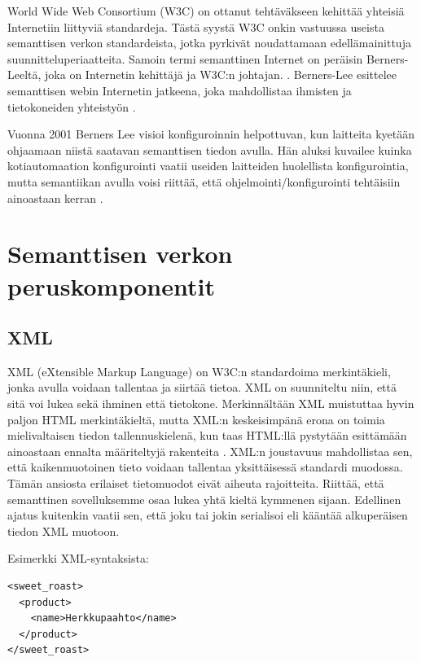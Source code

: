 \documentclass[finnish, 12pt, a4paper, elec, utf8, pdfa, online]{aaltothesis}
\begin{document}
World Wide Web Consortium (W3C) on ottanut tehtäväkseen kehittää yhteisiä Internetiin liittyviä standardeja. Tästä syystä W3C onkin vastuussa useista semanttisen verkon standardeista, jotka pyrkivät noudattamaan edellämainittuja suunnitteluperiaatteita. Samoin termi semanttinen Internet on peräisin Berners-Leeltä, joka on Internetin kehittäjä ja W3C:n johtajan. \cite{W3C}. Berners-Lee esittelee semanttisen webin Internetin jatkeena, joka mahdollistaa ihmisten ja tietokoneiden yhteistyön \cite{Berners_visio}.





Vuonna 2001 Berners Lee visioi konfiguroinnin helpottuvan, kun laitteita kyetään ohjaamaan niistä saatavan semanttisen tiedon avulla. Hän aluksi kuvailee kuinka kotiautomaation konfigurointi vaatii useiden laitteiden huolellista konfigurointia, mutta semantiikan avulla voisi riittää, että ohjelmointi/konfigurointi tehtäisiin ainoastaan kerran \cite{Berners_visio}.







\clearpage
\section{Semanttisen verkon peruskomponentit}

\subsection{XML}
XML (eXtensible Markup Language) on W3C:n standardoima merkintäkieli, jonka avulla voidaan tallentaa ja siirtää tietoa. XML on suunniteltu niin, että sitä voi lukea sekä ihminen että tietokone. Merkinnältään XML muistuttaa hyvin paljon HTML merkintäkieltä, mutta XML:n keskeisimpänä erona on toimia mielivaltaisen tiedon tallennuskielenä, kun taas HTML:llä pystytään esittämään ainoastaan ennalta määriteltyjä rakenteita \cite{IEEE_XML}. XML:n joustavuus mahdollistaa sen, että kaikenmuotoinen tieto voidaan tallentaa yksittäisessä standardi muodossa. Tämän ansiosta erilaiset tietomuodot eivät aiheuta rajoitteita. Riittää, että semanttinen sovelluksemme osaa lukea yhtä kieltä kymmenen sijaan. Edellinen ajatus kuitenkin vaatii sen, että joku tai jokin serialisoi eli kääntää alkuperäisen tiedon XML muotoon.

Esimerkki XML-syntaksista:
\begin{lstlisting}
<sweet_roast>
  <product>
    <name>Herkkupaahto</name>
  </product>
</sweet_roast>
\end{lstlisting}
\end{document}
